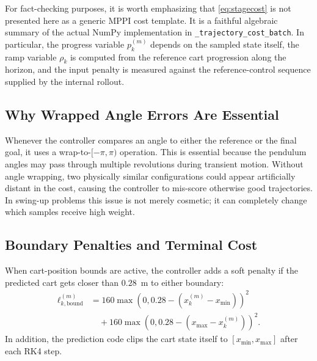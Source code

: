 \documentclass[conference]{IEEEtran}
\begin{document}
For fact-checking purposes, it is worth emphasizing that \eqref{eq:stagecost} is not presented here as a generic MPPI cost template. It is a faithful algebraic summary of the actual NumPy implementation in \texttt{\_trajectory\_cost\_batch}. In particular, the progress variable $p_k^{(m)}$ depends on the sampled state itself, the ramp variable $\rho_k$ is computed from the reference cart progression along the horizon, and the input penalty is measured against the reference-control sequence supplied by the internal rollout.

\subsection{Why Wrapped Angle Errors Are Essential}
Whenever the controller compares an angle to either the reference or the final goal, it uses a wrap-to-$[-\pi,\pi)$ operation. This is essential because the pendulum angles may pass through multiple revolutions during transient motion. Without angle wrapping, two physically similar configurations could appear artificially distant in the cost, causing the controller to mis-score otherwise good trajectories. In swing-up problems this issue is not merely cosmetic; it can completely change which samples receive high weight.

\subsection{Boundary Penalties and Terminal Cost}
When cart-position bounds are active, the controller adds a soft penalty if the predicted cart gets closer than $0.28$~m to either boundary:
\begin{align}
\ell_{k,\mathrm{bound}}^{(m)} &= 160 \max(0, 0.28 - (x_k^{(m)} - x_{\min}))^2 \nonumber \\
&\quad + 160 \max(0, 0.28 - (x_{\max} - x_k^{(m)}))^2.
\end{align}
In addition, the prediction code clips the cart state itself to $[x_{\min}, x_{\max}]$ after each RK4 step.
\end{document}
